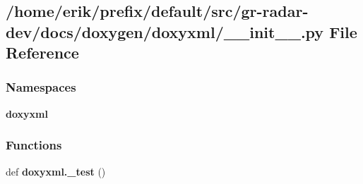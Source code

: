 \subsection{/home/erik/prefix/default/src/gr-\/radar-\/dev/docs/doxygen/doxyxml/\+\_\+\+\_\+init\+\_\+\+\_\+.py File Reference}
\label{docs_2doxygen_2doxyxml_2____init_____8py}
\subsubsection*{Namespaces}
\begin{DoxyCompactItemize}
\item 
 {\bf doxyxml}
\end{DoxyCompactItemize}
\subsubsection*{Functions}
\begin{DoxyCompactItemize}
\item 
def {\bf doxyxml.\+\_\+test} ()
\end{DoxyCompactItemize}
